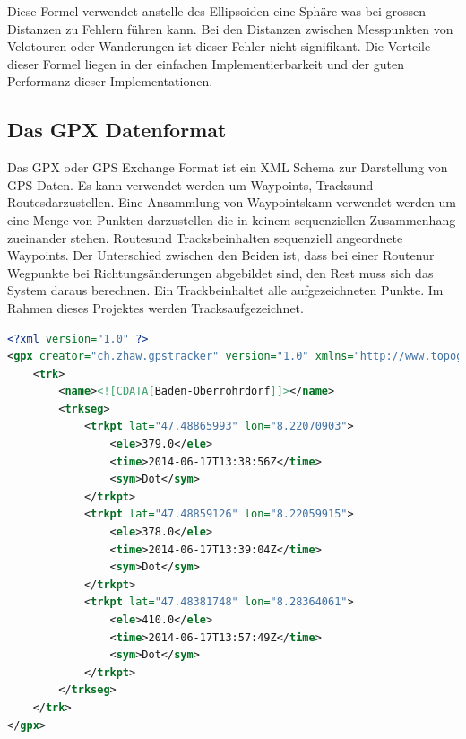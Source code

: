 Diese Formel verwendet anstelle des Ellipsoiden eine Sphäre was bei grossen Distanzen zu Fehlern führen kann. Bei den Distanzen zwischen Messpunkten von Velotouren oder Wanderungen ist dieser Fehler nicht signifikant. Die Vorteile dieser Formel liegen in der einfachen Implementierbarkeit und der guten Performanz dieser Implementationen. 

\subsection{Das GPX Datenformat}
Das GPX oder GPS Exchange Format ist ein XML Schema zur Darstellung von GPS Daten. Es kann verwendet werden um \flqq Waypoints\frqq, \flqq Tracks\frqq und \flqq Routes\frqq darzustellen. Eine Ansammlung von \flqq Waypoints\frqq kann verwendet werden um eine Menge von Punkten darzustellen die in keinem sequenziellen Zusammenhang zueinander stehen. \flqq Routes\frqq und \flqq Tracks\frqq beinhalten sequenziell angeordnete \flqq Waypoints\frqq. Der Unterschied zwischen den Beiden ist, dass bei einer \flqq Route\frqq nur Wegpunkte bei Richtungsänderungen abgebildet sind, den Rest muss sich das System daraus berechnen. Ein \flqq Track\frqq beinhaltet alle aufgezeichneten Punkte. Im Rahmen dieses Projektes werden \flqq Tracks\frqq aufgezeichnet. \cite{gpxwiki} \cite{gpx}

\begin{lstlisting}[language=XML, caption={GPX Beispielfile}]
<?xml version="1.0" ?>
<gpx creator="ch.zhaw.gpstracker" version="1.0" xmlns="http://www.topografix.com/GPX/1/0" xmlns:xsi="http://www.w3.org/2001/XMLSchema-instance" xsi:schemaLocation="http://www.topografix.com/GPX/1/0 http://www.topografix.com/GPX/1/0/gpx.xsd">
    <trk>
        <name><![CDATA[Baden-Oberrohrdorf]]></name>
        <trkseg>
            <trkpt lat="47.48865993" lon="8.22070903">
                <ele>379.0</ele>
                <time>2014-06-17T13:38:56Z</time>
                <sym>Dot</sym>
            </trkpt>
            <trkpt lat="47.48859126" lon="8.22059915">
                <ele>378.0</ele>
                <time>2014-06-17T13:39:04Z</time>
                <sym>Dot</sym>
            </trkpt>
            <trkpt lat="47.48381748" lon="8.28364061">
                <ele>410.0</ele>
                <time>2014-06-17T13:57:49Z</time>
                <sym>Dot</sym>
            </trkpt>
        </trkseg>
    </trk>
</gpx>
\end{lstlisting}